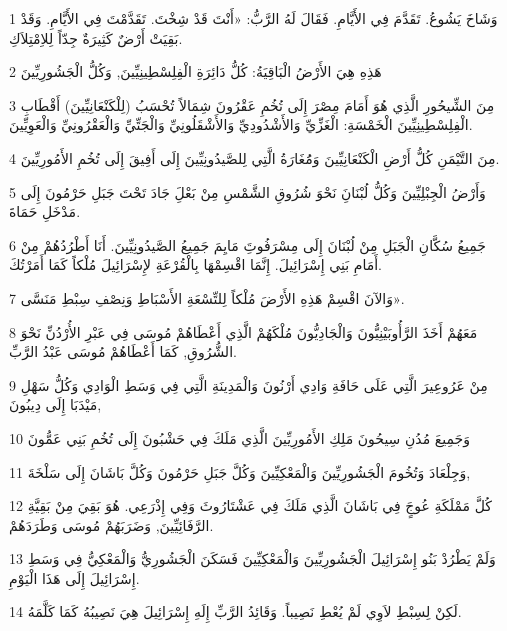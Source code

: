 \par 1 وَشَاخَ يَشُوعُ. تَقَدَّمَ فِي الأَيَّامِ. فَقَالَ لَهُ الرَّبُّ: «أَنْتَ قَدْ شِخْتَ. تَقَدَّمْتَ فِي الأَيَّامِ. وَقَدْ بَقِيَتْ أَرْضٌ كَثِيرَةٌ جِدّاً لِلاِمْتِلاَكِ.
\par 2 هَذِهِ هِيَ الأَرْضُ الْبَاقِيَةُ: كُلُّ دَائِرَةِ الْفِلِسْطِينِيِّينَ, وَكُلُّ الْجَشُورِيِّينَ
\par 3 مِنَ الشِّيحُورِ الَّذِي هُوَ أَمَامَ مِصْرَ إِلَى تُخُمِ عَقْرُونَ شِمَالاً تُحْسَبُ (لِلْكَنْعَانِيِّينَ) أَقْطَابِ الْفِلِسْطِينِيِّينَ الْخَمْسَةِ: الْغَزِّيِّ وَالأَشْدُودِيِّ وَالأَشْقَلُونِيِّ وَالْجَتِّيِّ وَالْعَقْرُونِيِّ وَالْعَوِيِّينَ.
\par 4 مِنَ التَّيْمَنِ كُلُّ أَرْضِ الْكَنْعَانِيِّينَ وَمَُغَارَةُ الَّتِي لِلصَّيدُونِيِّينَ إِلَى أَفِيقَ إِلَى تُخُمِ الأَمُورِيِّينَ.
\par 5 وَأَرْضُ الْجِبْلِيِّينَ وَكُلُّ لُبْنَانَِ نَحْوَ شُرُوقِ الشَّمْسِ مِنْ بَعْلَِ جَادَ تَحْتَ جَبَلِ حَرْمُونَ إِلَى مَدْخَلِ حَمَاةَ.
\par 6 جَمِيعُ سُكَّانِ الْجَبَلِ مِنْ لُبْنَانَ إِلَى مِسْرَفُوتَِ مَايِمَ جَمِيعُ الصَّيدُونِيِّينَ. أَنَا أَطْرُدُهُمْ مِنْ أَمَامِ بَنِي إِسْرَائِيلَ. إِنَّمَا اقْسِمْهَا بِالْقُرْعَةِ لإِسْرَائِيلَ مُلْكاً كَمَا أَمَرْتُكَ.
\par 7 وَالآنَ اقْسِمْ هَذِهِ الأَرْضَ مُلْكاً لِلتِّسْعَةِ الأَسْبَاطِ وَنِصْفِ سِبْطِ مَنَسَّى».
\par 8 مَعَهُمْ أَخَذَ الرَّأُوبَيْنِيُّونَ وَالْجَادِيُّونَ مُلْكَهُمْ الَّذِي أَعْطَاهُمْ مُوسَى فِي عَبْرِ الأُرْدُنِّ نَحْوَ الشُّرُوقِ, كَمَا أَعْطَاهُمْ مُوسَى عَبْدُ الرَّبِّ.
\par 9 مِنْ عَرُوعِيرَ الَّتِي عَلَى حَافَةِ وَادِي أَرْنُونَ وَالْمَدِينَةِ الَّتِي فِي وَسَطِ الْوَادِي وَكُلُّ سَهْلِ مَيْدَبَا إِلَى دِيبُونَ,
\par 10 وَجَمِيعَ مُدُنِ سِيحُونَ مَلِكِ الأَمُورِيِّينَ الَّذِي مَلَكَ فِي حَشْبُونَ إِلَى تُخُمِ بَنِي عَمُّونَ
\par 11 وَجِلْعَادَ وَتُخُومَ الْجَشُورِيِّينَ وَالْمَعْكِيِّينَ وَكُلَّ جَبَلِ حَرْمُونَ وَكُلَّ بَاشَانَ إِلَى سَلْخَةَ,
\par 12 كُلَّ مَمْلَكَةِ عُوجٍَ فِي بَاشَانَ الَّذِي مَلَكَ فِي عَشْتَارُوثَ وَفِي إِذْرَعِي. هُوَ بَقِيَ مِنْ بَقِيَّةِ الرَّفَائِيِّينَ, وَضَرَبَهُمْ مُوسَى وَطَرَدَهُمْ.
\par 13 وَلَمْ يَطْرُدْ بَنُو إِسْرَائِيلَ الْجَشُورِيِّينَ وَالْمَعْكِيِّينَ فَسَكَنَ الْجَشُورِيُّ وَالْمَعْكِيُّ فِي وَسَطِ إِسْرَائِيلَ إِلَى هَذَا الْيَوْمِ.
\par 14 لَكِنْ لِسِبْطِ لاَوِي لَمْ يُعْطِ نَصِيباً. وَقَائِدُ الرَّبِّ إِلَهِ إِسْرَائِيلَ هِيَ نَصِيبُهُ كَمَا كَلَّمَهُ.
